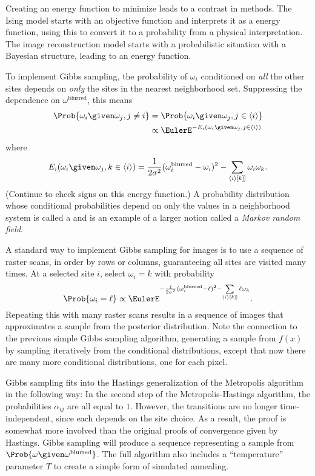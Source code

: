 \documentclass[12pt]{article}
\begin{document}
Creating an energy function to minimize leads to a contrast in methods.
The Ising model starts with an objective function and interprets it as a
energy function, using this to convert it to a probability from a
physical interpretation.  The image reconstruction model starts with a
probabilistic situation with a Bayesian structure, leading to an energy
function.

To implement Gibbs sampling, the probability of \( \omega_i \)
conditioned on \emph{all} the other sites depends on \emph{only} the sites in the
nearest neighborhood set.  Suppressing the dependence on \( \omega^{\text
{blurred}} \), this means
\begin{align*}
    \Prob{\omega_i \given \omega_j, j \ne i } &= \Prob { \omega_i \given
    \omega_j, j \in \langle i \rangle } \\
    & \propto \EulerE^{-E_i(\omega_i \given \omega_j, j \in \langle i
    \rangle)}
\end{align*}
where
\[
    E_i(\omega_i \given \omega_j, k \in \langle i\rangle) = \frac{1}{2\sigma^2}
    (\omega_i^{\text{blurred}}-\omega_i)^2 - \sum\limits_{\langle i
    \rangle[k]]} \omega_i\omega_k.
\] (Continue to check signs on this energy function.) A probability
distribution whose conditional probabilities depend on only the values
in a neighborhood system is called a %
and is an example of a larger notion called a \emph{Markov random field}.%

A standard way to implement Gibbs sampling for images is to use a
sequence of raster scans, in order by rows or columns, guaranteeing all
sites are visited many times.  At a selected site \( i \), select \(
\omega_i = k \) with probability
\[
    \Prob{\omega_i = \ell} \propto \EulerE^{-\frac{1}{2\sigma^2}(\omega_i^{\text
    {blurred}}-\ell)^2 - \sum\limits_{\langle i \rangle [k]]} \ell \omega_k}.
\] Repeating this with many raster scans results in a sequence of images
that approximates a sample from the posterior distribution.  Note the
connection to the previous simple Gibbs sampling algorithm, generating a
sample from \( f(x) \) by sampling iteratively from the conditional
distributions, except that now there are many more conditional distributions, one
for each pixel.

Gibbs sampling fits into the Hastings generalization of the Metropolis
algorithm in the following way:  In the second step of the
Metropolis-Hastings algorithm, the probabilities \( \alpha_{ij} \) are
all equal to \( 1 \).  However, the transitions are no longer
time-independent, since each depends on the site choice.  As a result,
the proof is somewhat more involved than the original proofs of
convergence given by Hastings.  Gibbs sampling will produce a sequence
representing a sample from \( \Prob{\omega \given \omega^{\text{blurred}}}
\).  The full algorithm also includes a ``temperature'' parameter \( T \)
to create a simple form of simulated annealing.
\end{document}
